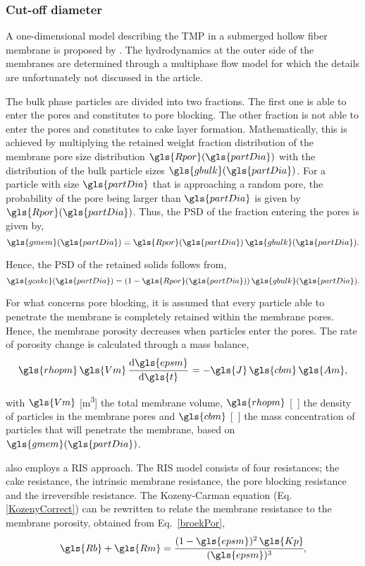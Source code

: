\subsubsection{Cut-off diameter}
A one-dimensional model describing the \gls{TMP} in a submerged hollow fiber membrane is proposed by \cite{Broeckmann2006}. The hydrodynamics at the outer side of the membranes are determined through a multiphase flow model for which the details are unfortunately not discussed in the article. \par 
The bulk phase particles are divided into two fractions. The first one is able to enter the pores and constitutes to pore blocking. The other fraction is not able to enter the pores and constitutes to cake layer formation. Mathematically, this is achieved by multiplying the retained weight fraction distribution of the membrane pore size distribution $\gls{Rpor}(\gls{partDia})$ with the distribution of the bulk particle sizes $\gls{gbulk}(\gls{partDia})$. For a particle with size $\gls{partDia}$ that is approaching a random pore, the probability of the pore being larger than $\gls{partDia}$ is given by $\gls{Rpor}(\gls{partDia})$. Thus, the \gls{PSD} of the fraction entering the pores is given by,
\begin{equation}
\gls{gmem}(\gls{partDia})=\gls{Rpor}(\gls{partDia})\, \gls{gbulk}(\gls{partDia})
\label{BroekEntering} .
\end{equation}

Hence, the \gls{PSD} of the retained solids follows from,
\begin{equation}
\gls{gcake}(\gls{partDia})=(1-\gls{Rpor}(\gls{partDia}))\, \gls{gbulk}(\gls{partDia})
\label{BroekRetained} .
\end{equation}

For what concerns pore blocking, it is assumed that every particle able to penetrate the membrane is completely retained within the membrane pores. Hence, the membrane porosity decreases when particles enter the pores. The rate of porosity change is calculated through a mass balance,
\begin{equation}
\gls{rhopm}\, \gls{Vm} \, \cfrac{\mathrm{d} \gls{epsm}}{\mathrm{d}\gls{t}} \, =-\gls{J}\, \gls{cbm}\, \gls{Am}
\label{broekPor} ,
\end{equation}

with $\gls{Vm}$ [\unit{\cubic\metre}] the total membrane volume, $\gls{rhopm}$ [\kilogram\, \rpcubic\metre] the density of particles in the membrane pores and $\gls{cbm}$ [\kilogram\, \rpcubic\metre] the mass concentration of particles that will penetrate the membrane, based on $\gls{gmem}(\gls{partDia})$. \par 
\cite{Broeckmann2006} also employs a \gls{RIS} approach.
The RIS model consists of four resistances; the cake resistance, the intrinsic membrane resistance, the pore blocking resistance and the irreversible resistance.
The Kozeny-Carman equation (Eq. \ref{KozenyCorrect}) can be rewritten to relate the membrane resistance to the membrane porosity, obtained from Eq.\ \ref{broekPor},
\begin{equation}
\gls{Rb} + \gls{Rm} = \cfrac{(1-\gls{epsm})^2\, \gls{Kp}}{(\gls{epsm})^3}
\label{Broeker} ,
\end{equation}

